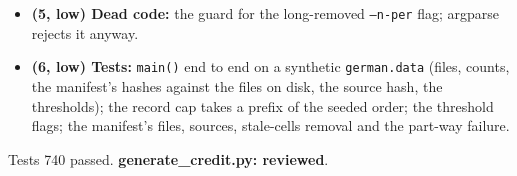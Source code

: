 \documentclass{article}
\begin{document}
\begin{itemize}
        pair row and cells row: \texttt{credit\_good}, the quality label the probe split and the cross-marker
        groups use, and the corpus's own sex, marital status and age, which nothing reads yet. Kept (decided
        2026-09-28) for a check of the unrendered real attributes; the datasets keep them out of every result.
  \item \textbf{(5, low) Dead code:} the guard for the long-removed \texttt{--n-per} flag; argparse rejects it anyway.
  \item \textbf{(6, low) Tests:} \texttt{main()} end to end on a synthetic \texttt{german.data} (files, counts, the
        manifest's hashes against the files on disk, the source hash, the thresholds); the record cap takes a
        prefix of the seeded order; the threshold flags; the manifest's files, sources, stale-cells removal and
        the part-way failure.
\end{itemize}
Tests 740 passed. \textbf{generate\_credit.py: reviewed}.
\end{document}
